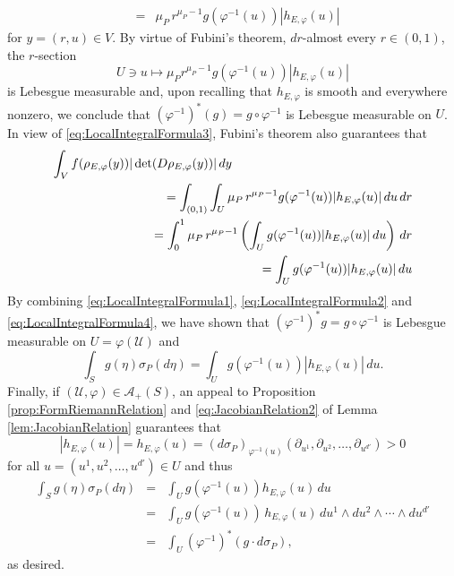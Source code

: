 \documentclass[smallextended]{svjour3}
\theoremstyle{remark}
\renewenvironment{proof}[1][\proofname]{\renewcommand\xproofname{#1}\xproof}{\endxproof}
\renewcommand\det{\operatorname{det}}
\begin{document}
\begin{proof}
\begin{eqnarray}
    &=& \mu_P\,r^{\mu_P-1}g(\varphi^{-1}(u))|h_{E,\varphi}(u)|
\end{eqnarray}
for $y=(r,u)\in V$. By virtue of Fubini's theorem, $dr$-almost every $r\in (0,1)$, the $r$-section 
\begin{equation*}
    U\ni u\mapsto \mu_P r^{\mu_P-1}g(\varphi^{-1}(u))|h_{E,\varphi}(u)|
\end{equation*}
is Lebesgue measurable and,  upon recalling that $h_{E,\varphi}$ is smooth and everywhere nonzero, we conclude that $(\varphi^{-1})^*(g)=g\circ\varphi^{-1}$ is Lebesgue measurable on $U$. In view of \eqref{eq:LocalIntegralFormula3}, Fubini's theorem also guarantees that
\begin{eqnarray}\label{eq:LocalIntegralFormula4}\nonumber
    \int_V f(\rho_{E,\varphi}(y))|\det(D\rho_{E,\varphi}(y))|\,dy&&\nonumber\\
    && \hspace{-1in} =\int_{(0,1)}\int_U \mu_P\, r^{\mu_P-1}g(\varphi^{-1}(u))|h_{E,\varphi}(u)|\,du\,dr\nonumber \\
    && \hspace{-1in} =\int_0^1\mu_P\, r^{\mu_P-1}\left(\int_U g(\varphi^{-1}(u))|h_{E,\varphi}(u)|\,du\right)\,dr\nonumber \\
    && \hspace{-1in} = \int_U g(\varphi^{-1}(u))|h_{E,\varphi}(u)|\,du
\end{eqnarray}
By combining \eqref{eq:LocalIntegralFormula1}, \eqref{eq:LocalIntegralFormula2} and \eqref{eq:LocalIntegralFormula4}, we have shown that $(\varphi^{-1})^*g=g\circ\varphi^{-1}$ is Lebesgue measurable on $U=\varphi(\mathcal{U})$ and
\begin{equation*}
    \int_S g(\eta)\sigma_P(d\eta)=\int_U g(\varphi^{-1}(u))|h_{E,\varphi}(u)|\,du.
\end{equation*}
Finally, if $(\mathcal{U},\varphi)\in\mathcal{A}_+(S)$, an appeal to Proposition \ref{prop:FormRiemannRelation} and \eqref{eq:JacobianRelation2} of Lemma \ref{lem:JacobianRelation} guarantees that
\begin{equation*}
    |h_{E,\varphi}(u)|=h_{E,\varphi}(u)=(d\sigma_P)_{\varphi^{-1}(u)}(\partial_{u^1},\partial_{u^2},\dots,\partial_{u^{d'}})>0
\end{equation*}
for all $u=(u^1,u^2,\dots,u^{d'})\in U$ and thus
\begin{eqnarray*}
        \int_S g(\eta)\sigma_P(d\eta)&=&\int_U g(\varphi^{-1}(u))h_{E,\varphi}(u)\,du\\
        &=&\int_U g(\varphi^{-1}(u))\,h_{E,\varphi}(u)\,du^1\wedge du^2\wedge\cdots \wedge du^{d'}\\
        &=&\int_U (\varphi^{-1})^*(g\cdot d\sigma_P),
\end{eqnarray*}
as desired. 
\end{proof}
\end{document}
